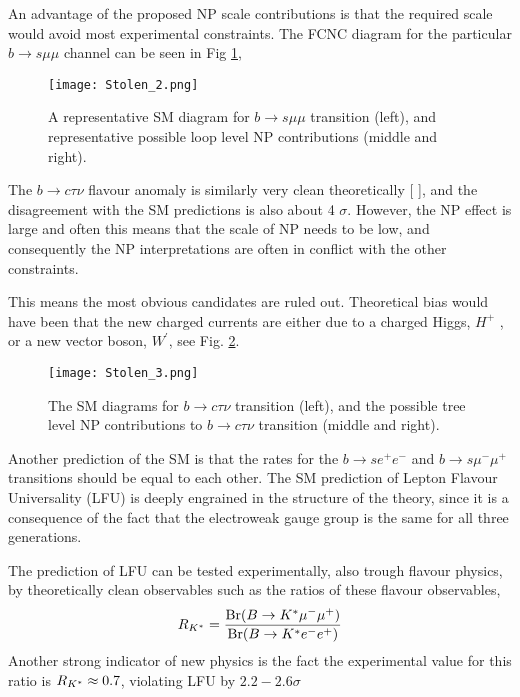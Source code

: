 An advantage of the proposed NP scale contributions is that the required scale would avoid most experimental constraints. The FCNC diagram for the particular $b \rightarrow s \mu \mu$ channel can be seen in Fig \ref{fig:Flavour_D_2_Muon}, 

\begin{figure}[H]
	\centering
	\texttt{[image: Stolen\_2.png]}
	\caption{A representative SM diagram for $b \rightarrow s \mu \mu$ transition (left), and representative possible loop level NP
contributions (middle and right).}
	\label{fig:Flavour_D_2_Muon}
\end{figure}

The $b \rightarrow c \tau \nu$ flavour anomaly is similarly very clean theoretically [
], and the disagreement with the
SM predictions is also about 4 $\sigma$. However, the NP effect is large and often this means that the scale of NP needs to be low, and consequently the NP interpretations are often in conflict with the other constraints.

This means the most obvious candidates are ruled out. Theoretical bias would have been that the new charged currents are either due to a charged Higgs, $H^+$ , or a new vector boson, $W^\prime$, see Fig. \ref{fig:Flavour_D_3_Tau}.

\begin{figure}[H]	
	\centering
	\texttt{[image: Stolen\_3.png]}
	\caption{The SM diagrams for $b \rightarrow c \tau \nu$ transition (left), and the possible tree level NP contributions to $b \rightarrow c \tau \nu$ transition (middle and right).}
	\label{fig:Flavour_D_3_Tau}
\end{figure}

Another prediction of the SM is that the rates for the  $b \rightarrow s e^+ e^-$ and  $b \rightarrow s \mu^- \mu^+$ transitions should be equal to each other. The SM prediction of Lepton Flavour Universality (LFU) is deeply engrained in the structure of the theory, since it is a consequence of the fact that the electroweak gauge group is the same for all three generations. 

The prediction of LFU can be tested experimentally, also trough flavour physics, by theoretically clean observables such as the ratios of these flavour observables, 
%
\begin{equation}
R_{K^{\**}} = \frac{\text{Br}( B \rightarrow K^{\**} \mu^- \mu^+ )}{\text{Br} (  B \rightarrow K^{\**} e^- e^+  )}
\end{equation}
% 
Another strong indicator of new physics is the fact the experimental value for this ratio is $R_{K^{\**}} \approx 0.7$, violating LFU by $2.2 - 2.6 \sigma$

